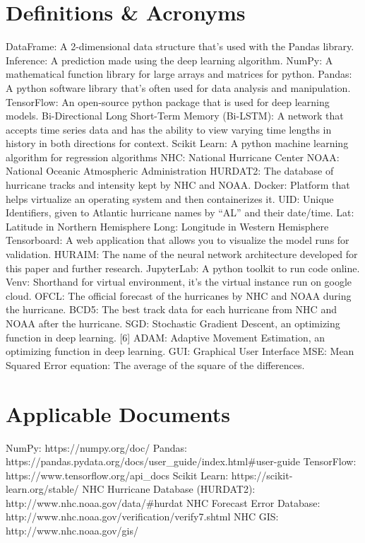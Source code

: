 \documentclass{article}
\begin{document}
\section{Definitions & Acronyms}
DataFrame: A 2-dimensional data structure that’s used with the Pandas library.
Inference: A prediction made using the deep learning algorithm.
NumPy: A mathematical function library for large arrays and matrices for python.
Pandas: A python software library that’s often used for data analysis and manipulation.
TensorFlow: An open-source python package that is used for deep learning models.
Bi-Directional Long Short-Term Memory (Bi-LSTM): A network that accepts time series data and has the ability to view varying time lengths in history in both directions for context.
Scikit Learn: A python machine learning algorithm for regression algorithms
NHC: National Hurricane Center
NOAA: National Oceanic Atmospheric Administration
HURDAT2: The database of hurricane tracks and intensity kept by NHC and NOAA.
Docker: Platform that helps virtualize an operating system and then containerizes it.
UID: Unique Identifiers, given to Atlantic hurricane names by “AL” and their date/time.
Lat: Latitude in Northern Hemisphere
Long: Longitude in Western Hemisphere
Tensorboard: A web application that allows you to visualize the model runs for validation. 
HURAIM: The name of the neural network architecture developed for this paper and further research.
JupyterLab: A python toolkit to run code online.
Venv: Shorthand for virtual environment, it’s the virtual instance run on google cloud.
OFCL: The official forecast of the hurricanes by NHC and NOAA during the hurricane.
BCD5: The best track data for each hurricane from NHC and NOAA after the hurricane.
SGD: Stochastic Gradient Descent, an optimizing function in deep learning. [6]
ADAM: Adaptive Movement Estimation, an optimizing function in deep learning.
GUI: Graphical User Interface
MSE: Mean Squared Error equation: The average of the square of the differences.

\section{Applicable Documents}
NumPy: https://numpy.org/doc/
Pandas: https://pandas.pydata.org/docs/user_guide/index.html#user-guide
TensorFlow: https://www.tensorflow.org/api_docs
Scikit Learn: https://scikit-learn.org/stable/
NHC Hurricane Database (HURDAT2): http://www.nhc.noaa.gov/data/#hurdat
NHC Forecast Error Database: http://www.nhc.noaa.gov/verification/verify7.shtml
NHC GIS: http://www.nhc.noaa.gov/gis/
\end{document}
